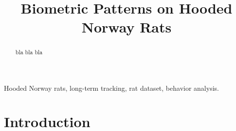 \documentclass[conference,10pt,times,letter]{IEEEtran}
\begin{document}
%
\title{Biometric Patterns on Hooded Norway Rats}

\author{
\and
{}
}

\maketitle

\begin{abstract}
bla bla bla
\end{abstract}

\begin{IEEEkeywords}
Hooded Norway rats,  long-term tracking, rat dataset, behavior analysis.
\end{IEEEkeywords}

%
\IEEEpeerreviewmaketitle

\section{Introduction}
\end{document}
